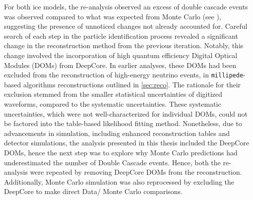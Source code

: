 For both ice models, the re-analysis observed an excess of double cascade events was observed compared to what was expected from Monte Carlo (see ), suggesting the presence of unnoticed changes not already accounted for. Careful search of each step in the particle identification process revealed a significant change in the reconstruction method from the previous iteration. Notably, this change involved the incorporation of high quantum efficiency Digital Optical Modules (DOMs) from DeepCore. In earlier analyses, these DOMs had been excluded from the reconstruction of high-energy neutrino events, in \texttt{millipede}-based algorithms reconstructions outlined in \ref{sec:reco}. The rationale for their exclusion stemmed from the smaller statistical uncertainties of digitized waveforms, compared to the systematic uncertainties. These systematic uncertainties, which were not well-characterized for individual DOMs, could not be factored into the table-based likelihood fitting method. Nonetheless, due to advancements in simulation, including enhanced reconstruction tables and detector simulations, the analysis presented in this thesis included the DeepCore DOMs, hence the next step was to explore why Monte Carlo predictions had underestimated the number of Double Cascade events. Hence, both the re-analysis were repeated by removing DeepCore DOMs from the reconstruction. Additionally, Monte Carlo simulation was also reprocessed by excluding the DeepCore to make direct Data/ Monte Carlo comparisons.

